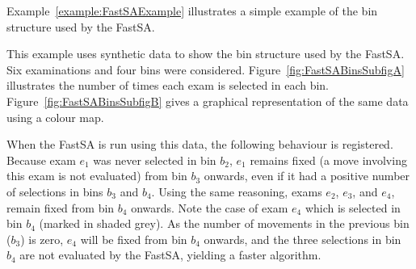 Example~\ref{example:FastSAExample} illustrates a simple example of the bin structure used by the FastSA. 


%
%
%



\begin{exmp}
	\label{example:FastSAExample}
	
	This example uses synthetic data to show the bin structure used by the FastSA. Six examinations and four bins were considered. Figure~\ref{fig:FastSABinsSubfigA} illustrates the number of times each exam is selected in each bin. Figure~\ref{fig:FastSABinsSubfigB} gives a graphical representation of the same data using a colour map.
	
	When the FastSA is run using this data, the following behaviour is registered. Because exam $e_1$ was never selected in bin $b_2$, $e_1$ remains fixed (a move involving this exam is not evaluated) from bin $b_3$ onwards, even if it had a positive number of selections in bins $b_3$ and  $b_4$. Using the same reasoning, exams $e_2$, $e_3$, and $e_4$, remain fixed from bin $b_4$ onwards. Note the case of exam  $e_4$ which is selected in bin $b_4$ (marked in shaded grey). As the number of movements in the previous bin ($b_3$) is zero, $e_4$ will be  fixed from bin $b_4$ onwards, and the three selections in bin $b_4$ are not evaluated by the FastSA, yielding a faster algorithm.
\end{exmp}








